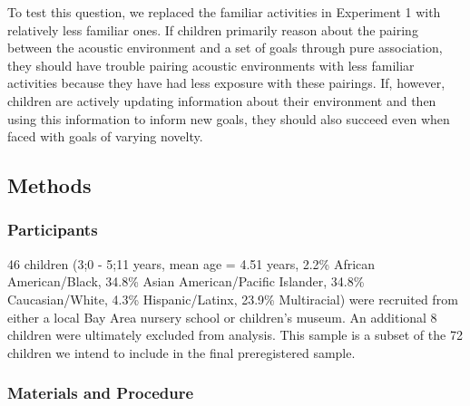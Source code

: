 \documentclass[10pt, letterpaper]{article}
\begin{document}
To test this question, we replaced the familiar activities in Experiment
1 with relatively less familiar ones. If children primarily reason about
the pairing between the acoustic environment and a set of goals through
pure association, they should have trouble pairing acoustic environments
with less familiar activities because they have had less exposure with
these pairings. If, however, children are actively updating information
about their environment and then using this information to inform new
goals, they should also succeed even when faced with goals of varying
novelty.

\hypertarget{methods-1}{%
\subsection{Methods}\label{methods-1}}

\hypertarget{participants-1}{%
\subsubsection{Participants}\label{participants-1}}

46 children (3;0 - 5;11 years, mean age = 4.51 years, 2.2\% African
American/Black, 34.8\% Asian American/Pacific Islander, 34.8\%
Caucasian/White, 4.3\% Hispanic/Latinx, 23.9\% Multiracial) were
recruited from either a local Bay Area nursery school or children's
museum. An additional 8 children were ultimately excluded from analysis.
This sample is a subset of the 72 children we intend to include in the
final preregistered sample.

\hypertarget{materials-and-procedure-1}{%
\subsubsection{Materials and
Procedure}\label{materials-and-procedure-1}}
\end{document}
